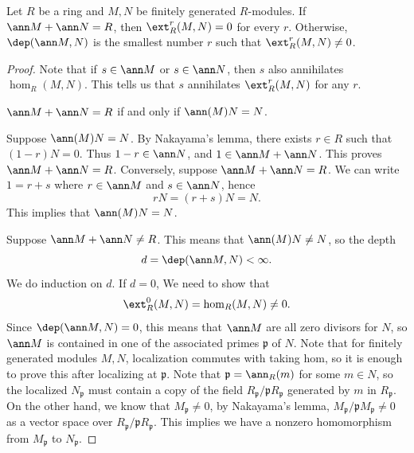 \begin{proposition} \label{depext}
     Let \(R\) be a ring and \(M,N\) be finitely generated \(R\)-modules. If \(\ann M+\ann N=R\), then \(\ext_R^r(M,N)=0\) for every \(r\). Otherwise, \(\dep(\ann M,N)\) is the smallest number \(r\) such that \(\ext_R^r(M,N)\neq 0\).
\end{proposition}

\begin{proof}
    Note that if \(s\in \ann M\) or \(s\in \ann N\), then \(s\) also annihilates \(\hom_R(M,N)\). This tells us that \(s\) annihilates \(\ext^r_R(M,N)\) for any \(r\).

    \begin{claim}
      \(\ann M+\ann N=R\) if and only if \(\ann(M)N=N\).
    \end{claim}
    \begin{claimproof}
      Suppose \(\ann(M)N=N\). By Nakayama's lemma, there exists \(r\in R\) such that \((1-r)N=0\). Thus \(1-r\in \ann N\), and \(1\in \ann M+\ann N\). This proves \(\ann M+\ann N=R\). Conversely, suppose \(\ann M+\ann N=R\). We can write \(1=r+s\) where \(r\in \ann M\) and \(s\in \ann N\), hence 
      \[rN=(r+s)N=N.\]
      This implies that \(\ann(M)N=N\).
    \end{claimproof}

    Suppose \(\ann M+\ann N\neq R\). This means that \(\ann (M)N\neq N\), so the depth 
    \[d=\dep (\ann M,N)<\infty.\]
    We do induction on \(d\). If \(d=0\), We need to show that 
    \[\ext^0_R(M,N)=\hom_R(M,N)\neq 0.\]
    Since \(\dep(\ann M,N)=0\), this means that \(\ann M\) are all zero divisors for \(N\), so \(\ann M\) is contained in one of the associated primes \(\mathfrak{p}\) of \(N\). Note that for finitely generated modules \(M,N\), localization commutes with taking hom, so it is enough to prove this after localizing at \(\mathfrak{p}\). Note that \(\mathfrak{p}=\ann_R(m)\) for some \(m\in N\), so the localized \(N_\mathfrak{p}\) must contain a copy of the field \(R_\mathfrak{p}/\mathfrak{p}R_\mathfrak{p}\) generated by \(m\) in \(R_\mathfrak{p}\). On the other hand, we know that \(M_\mathfrak{p}\neq 0\), by Nakayama's lemma, \(M_\mathfrak{p}/\mathfrak{p}M_\mathfrak{p}\neq 0\) as a vector space over \(R_\mathfrak{p}/\mathfrak{p}R_\mathfrak{p}\). This implies we have a nonzero homomorphism from \(M_\mathfrak{p}\) to \(N_\mathfrak{p}\).


\end{proof}

